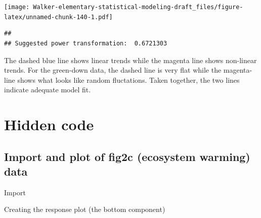 \documentclass[]{book}
\newenvironment{Shaded}{\begin{snugshade}}{\end{snugshade}}
\newcommand{\CommentTok}[1]{\textcolor[rgb]{0.56,0.35,0.01}{\textit{#1}}}
\newcommand{\KeywordTok}[1]{\textcolor[rgb]{0.13,0.29,0.53}{\textbf{#1}}}
\newcommand{\NormalTok}[1]{#1}
\newcommand{\OperatorTok}[1]{\textcolor[rgb]{0.81,0.36,0.00}{\textbf{#1}}}
\newcommand{\StringTok}[1]{\textcolor[rgb]{0.31,0.60,0.02}{#1}}
\begin{document}
\texttt{[image: Walker-elementary-statistical-modeling-draft\_files/figure-latex/unnamed-chunk-140-1.pdf]}

\begin{verbatim}
## 
## Suggested power transformation:  0.6721303
\end{verbatim}

The dashed blue line shows linear trends while the magenta line shows non-linear trends. For the green-down data, the dashed line is very flat while the magenta-line shows what looks like random fluctations. Taken together, the two lines indicate adequate model fit.

\hypertarget{hidden-code}{%
\section{Hidden code}\label{hidden-code}}

\hypertarget{import-and-plot-of-fig2c-ecosystem-warming-data}{%
\subsection{Import and plot of fig2c (ecosystem warming) data}\label{import-and-plot-of-fig2c-ecosystem-warming-data}}

Import

\begin{Shaded}
\end{Shaded}

Creating the response plot (the bottom component)
\end{document}
